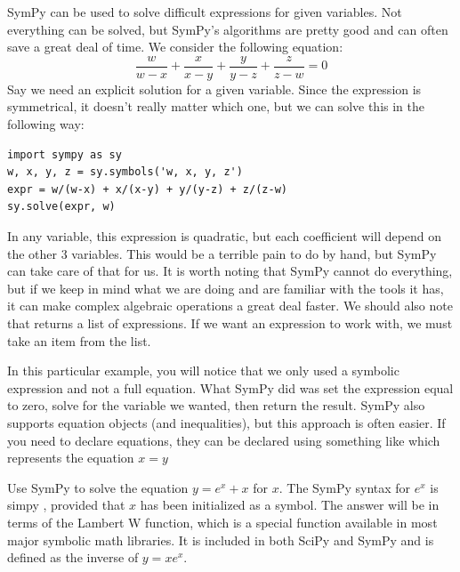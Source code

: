 SymPy can be used to solve difficult expressions for given variables.
Not everything can be solved, but SymPy's algorithms are pretty good and can often save a great deal of time.
We consider the following equation:
\begin{equation*}
\frac{w}{w-x}+\frac{x}{x-y}+\frac{y}{y-z}+\frac{z}{z-w}=0
\end{equation*}
Say we need an explicit solution for a given variable.
Since the expression is symmetrical, it doesn't really matter which one, but we can solve this in the following way:
\begin{lstlisting}
import sympy as sy
w, x, y, z = sy.symbols('w, x, y, z')
expr = w/(w-x) + x/(x-y) + y/(y-z) + z/(z-w)
sy.solve(expr, w)
\end{lstlisting}
In any variable, this expression is quadratic, but each coefficient will depend on the other 3 variables.
This would be a terrible pain to do by hand, but SymPy can take care of that for us.
It is worth noting that SymPy cannot do everything, but if we keep in mind what we are doing and are familiar with the tools it has, it can make complex algebraic operations a great deal faster.
We should also note that  returns a list of expressions.
If we want an expression to work with, we must take an item from the list.

In this particular example, you will notice that we only used a symbolic expression and not a full equation.
What SymPy did was set the expression equal to zero, solve for the variable we wanted, then return the result.
SymPy also supports equation objects (and inequalities), but this approach is often easier.
If you need to declare equations, they can be declared using something like  which represents the equation $x=y$

\begin{problem}
Use SymPy to solve the equation $y=e^x+x$ for $x$.
The SymPy syntax for $e^x$ is simpy , provided that $x$ has been initialized as a symbol.
The answer will be in terms of the Lambert W function, which is a special function available in most major symbolic math libraries.
It is included in both SciPy and SymPy and is defined as the inverse of $y=x e^x$.
\end{problem}

